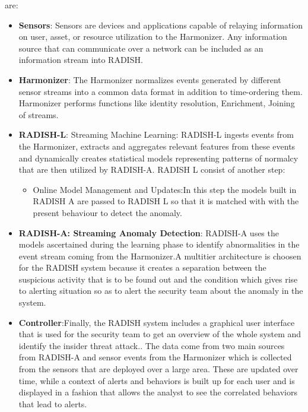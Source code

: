 \documentclass[10pt,a4paper,journal]{IEEEtran}
\begin{document}
\ISH are:
\begin{itemize}
    \item \textbf{Sensors}: Sensors are devices and applications capable of relaying information on user, asset, or resource utilization to the Harmonizer. Any information source that can communicate
    over a network can be included as an information stream into RADISH.
    \item \textbf{Harmonizer}: The Harmonizer normalizes events generated by
    different sensor streams into a common data format in addition
    to time-ordering them. Harmonizer performs functions like identity resolution, Enrichment, Joining of streams.
    \item \textbf{RADISH-L}: Streaming Machine Learning: RADISH-L ingests events from the Harmonizer, extracts and
aggregates relevant features from these events and dynamically creates statistical models representing patterns of normalcy that
are then utilized by RADISH-A. RADISH L consist of another step:
\begin{itemize}
\item Online Model Management and Updates:In this step the models built in RADISH A are passed to RADISH L so that it is matched with with the present behaviour to detect the anomaly.
\end{itemize}

\item \textbf{RADISH-A: Streaming Anomaly Detection}: RADISH-A uses the models ascertained during
the learning phase to identify abnormalities in the event stream coming from the Harmonizer.A multitier architecture is choosen for the RADISH system because it creates a separation between the suspicious activity that is to be found out and the condition which gives rise to alerting situation so as to alert the security team about the anomaly in the system. 
\item \textbf{Controller}:Finally, the RADISH system includes a graphical user interface that is used for the security team to get an overview of the whole system and identify the insider threat attack.. The data come from two main sources from RADISH-A and sensor events from the Harmonizer which is collected from the sensors that are deployed over a large area. These are updated over time, while a context of alerts and behaviors is built up for each user and is displayed in a fashion that allows the analyst to see the correlated behaviors
that lead to alerts.
\end{itemize}
\end{document}
